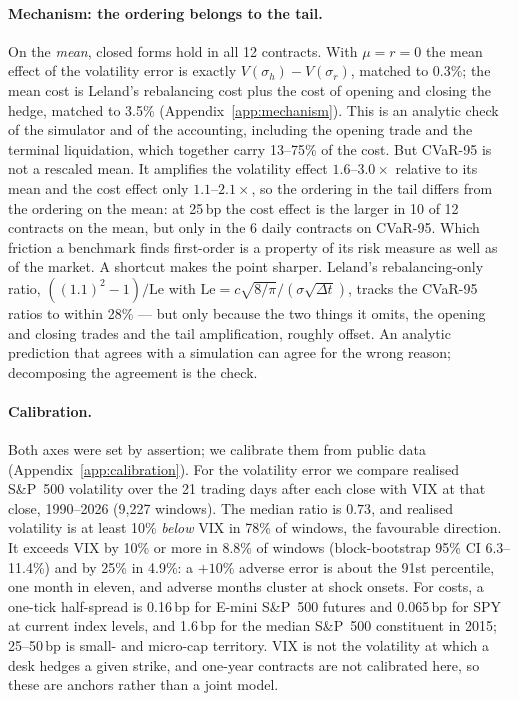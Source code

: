 \documentclass{article}
\newcommand{\cvar}{CVaR-95}
\newcommand{\bps}{\,bp}
\begin{document}
\paragraph{Mechanism: the ordering belongs to the tail.} On the \emph{mean}, closed forms hold in
all 12 contracts. With $\mu = r = 0$ the mean effect of the volatility error is exactly
$V(\sigma_h) - V(\sigma_r)$, matched to 0.3\%; the mean cost is Leland's rebalancing cost plus the
cost of opening and closing the hedge, matched to 3.5\% (Appendix~\ref{app:mechanism}). This is an
analytic check of the simulator and of the accounting, including the opening trade and the
terminal liquidation, which together carry 13--75\% of the cost. But \cvar{} is not a rescaled
mean. It amplifies the volatility
effect $1.6$--$3.0\times$ relative to its mean and the cost effect only $1.1$--$2.1\times$, so the
ordering in the tail differs from the ordering on the mean: at 25\bps{} the cost effect is the
larger in 10 of 12 contracts on the mean, but only in the 6 daily contracts on \cvar{}. Which
friction a benchmark finds first-order is a property of its risk measure as well as of the market.
A shortcut makes the point sharper. Leland's rebalancing-only ratio, $((1.1)^2 - 1)/\mathrm{Le}$
with $\mathrm{Le} = c\sqrt{8/\pi}/(\sigma\sqrt{\Delta t})$, tracks the \cvar{} ratios to within
28\% --- but only because the two things it omits, the opening and closing trades and the tail
amplification, roughly offset. An analytic prediction that agrees with a simulation can agree for
the wrong reason; decomposing the agreement is the check.

\paragraph{Calibration.} Both axes were set by assertion; we calibrate them from public data
(Appendix~\ref{app:calibration}). For the volatility error we compare realised S\&P~500
volatility over the 21 trading days after each close with VIX at that close, 1990--2026 (9{,}227
windows). The median ratio is $0.73$, and realised volatility is at least 10\% \emph{below} VIX in
78\% of windows, the favourable direction. It exceeds VIX by 10\% or more in 8.8\% of windows
(block-bootstrap 95\% CI 6.3--11.4\%) and by 25\% in 4.9\%: a $+10\%$ adverse error is about the
91st percentile, one month in eleven, and adverse months cluster at shock onsets. For costs, a
one-tick half-spread is 0.16\bps{} for E-mini S\&P~500 futures and 0.065\bps{} for SPY at current
index levels, and 1.6\bps{} for the median S\&P~500 constituent in 2015; 25--50\bps{} is small- and
micro-cap territory. VIX is not the volatility at which a desk hedges a given strike, and
one-year contracts are not calibrated here, so these are anchors rather than a joint model.
\end{document}
